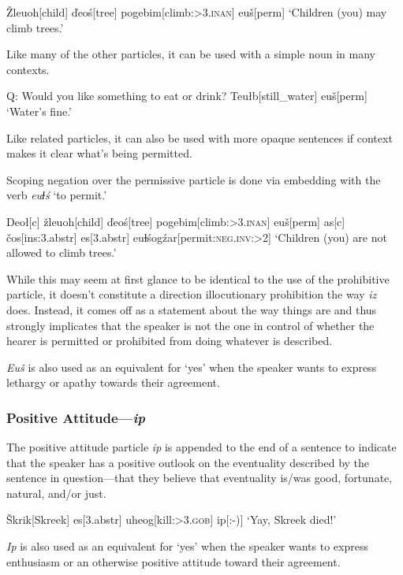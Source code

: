 \documentclass[10pt]{article}
\newcommand{\sk}{\textsc}
\newcommand{\vd}{ď}
\newcommand{\vc}{č}
\newcommand{\vz}{ž}
\newcommand{\vs}{š}
\newcommand{\vZ}{Ž}
\newcommand{\vS}{Š}
\newcommand{\dbl}{ⱡ}
\begin{document}
\ex
\begingl
\vZ leuoh[child]
\vd eo\'s[tree]
pogebim[climb:\sk{>3.inan}]
eu\vs[\sc perm]
\glft `Children (you) may climb trees.'
\endgl
\xe

Like many of the other particles, it can be used with a simple noun in many contexts.

\ex 
\begingl
\glpreamble
Q: Would you like something to eat or drink?
\endpreamble
{}
Teu\l b[still\_water]
eu\vs[\sc perm]
\glft\phantom{A: }`Water's fine.'
\endgl
\xe

Like related particles, it can also be used with more opaque sentences if context makes it clear what's being permitted. 

Scoping negation over the permissive particle is done via embedding with the verb \textit{eu\dbl\'s} `to permit.'

\ex 
\begingl
Deo\l[\sc c]
\vz leuoh[child]
\vd eo\'s[tree]
pogebim[climb:\sk{>3.inan}]
eu\vs[\sc perm]
\nogloss{,}
as[\sc c]
\vc os[\sc ins:3.abstr]
es[\sc 3.abstr]
eu\dbl\'sog\'zar[permit:\sk{neg.inv:>2}]
\glft `Children (you) are not allowed to climb trees.'
\endgl
\xe

While this may seem at first glance to be identical to the use of the prohibitive particle, it doesn't constitute a direction illocutionary prohibition the way \textit{iz} does. Instead, it comes off as a statement about the way things are and thus strongly implicates that the speaker is not the one in control of whether the hearer is permitted or prohibited from doing whatever is described.

\textit{Eu\vs} is also used as an equivalent for `yes' when the speaker wants to express lethargy or apathy towards their agreement.

\subsubsection{Positive Attitude---\textit{ip}}

The positive attitude particle \textit{ip} is appended to the end of a sentence to indicate that the speaker has a positive outlook on the eventuality described by the sentence in question---that they believe that eventuality is/was good, fortunate, natural, and/or just.

\ex
\begingl
\vS krik[Skreek]
es[\sc 3.abstr]
uheog[kill:\sk{>3.gob}]
ip[:-{)}]
\glft `Yay, Skreek died!'
\endgl
\xe

\textit{Ip} is also used as an equivalent for `yes' when the speaker wants to express enthusiasm or an otherwise positive attitude toward their agreement.
\end{document}
